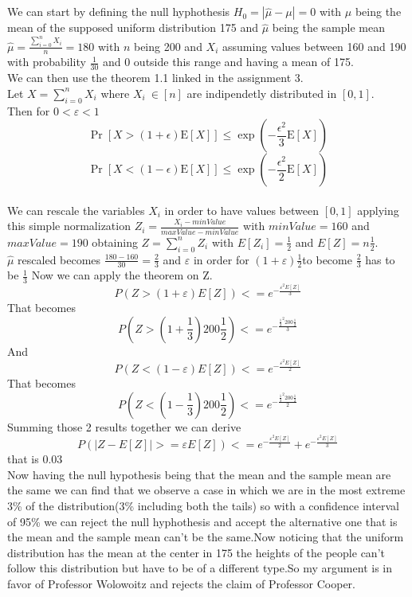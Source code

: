 \documentclass{article}
\begin{document}
\section{}
We can start by defining the null hyphothesis $H_0=|\hat{\mu}-\mu|=0$ with $\mu$ being the mean of the supposed uniform distribution 175 and $\hat{\mu}$ being the sample mean $\hat{\mu}=\frac{\sum_{i=0}^n X_i}{n}=180$ with $n$ being 200 and $X_i$ assuming values between 160 and 190 with probability $\frac{1}{30}$ and 0 outside this range and having a mean of 175.
\\We can then use the theorem 1.1 linked in the assignment 3.
\\Let $X=\sum_{i=0}^nX_i$ where $X_i \ \in [n]$ are indipendetly distributed in $[0,1]$.\\
Then for $0<\varepsilon<1$ $$\operatorname{Pr}[X>(1+\epsilon) \mathrm{E}[X]] \leq \exp \left(-\frac{\epsilon^2}{3} \mathrm{E}[X]\right)$$  $$\operatorname{Pr}[X<(1-\epsilon) \mathrm{E}[X]] \leq \exp \left(-\frac{\epsilon^2}{2} \mathrm{E}[X]\right)$$
\\We can rescale the variables $X_i$ in order to have values between $[0,1]$ applying this simple normalization $Z_i=\frac{X_i-minValue}{maxValue-minValue}$ with $minValue=160$ and $maxValue=190$ obtaining $Z=\sum_{i=0}^n Z_i$ with $E[Z_i]=\frac{1}{2}$ and $E[Z]=n\frac{1}{2}$.\\
$\hat{\mu}$ rescaled becomes $\frac{180-160}{30}=\frac{2}{3}$ and $\varepsilon$ in order for $(1+\varepsilon)\frac{1}{2}$to become $\frac{2}{3}$ has to be $\frac{1}{3}$
Now we can apply the theorem on Z.\\

$$P(Z>(1+\varepsilon)E[Z])<=e^{-\frac{\varepsilon^2 E[Z]}{3}}$$
That becomes
$$P(Z>(1+\frac{1}{3})200\frac{1}{2})<=e^{-\frac{\frac{1}{3}^2 200\frac{1}{2}}{3}}$$
And
$$P(Z<(1-\varepsilon)E[Z])<=e^{-\frac{\varepsilon^2 E[Z]}{2}}$$
That becomes
$$P(Z<(1-\frac{1}{3})200\frac{1}{2})<=e^{-\frac{\frac{1}{3}^2 200\frac{1}{2}}{2}}$$
Summing those 2 results together we can derive 
$$P(|Z-E[Z]|>=\varepsilon E[Z])<=e^{-\frac{\varepsilon^2 E[Z]}{2}}+e^{-\frac{\varepsilon^2 E[Z]}{3}}$$ that is $0.03$\\
Now having the null hypothesis being that the mean and the sample mean are the same we can find that we observe a case in which we are in the most extreme 3\% of the distribution(3\% including both the tails) so with a confidence interval of 95\% we can reject the null hyphothesis and accept the alternative one that is the mean and the sample mean can't be the same.Now noticing that the uniform distribution has the mean at the center in 175 the heights of the people can't follow this distribution but have to be of a different type.So my argument is in favor of Professor Wolowoitz and rejects the claim of Professor Cooper.
\end{document}
